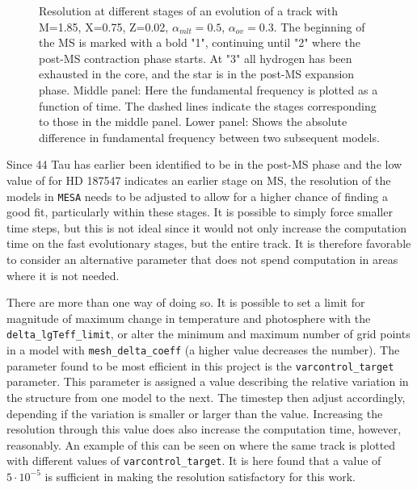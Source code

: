 \begin{figure}[htbp]
    \centering
    \caption{Resolution at different stages of an evolution of a track with M=1.85\msun, X=0.75, Z=0.02, $\alpha_{mlt} = 0.5$, $\alpha_{ov} = 0.3$. The beginning of the MS is marked with a bold "1", continuing until "2" where the post-MS contraction phase starts. At "3" all hydrogen has been exhausted in the core, and the star is in the post-MS expansion phase. Middle panel: Here the fundamental frequency is plotted as a function of time. The dashed lines indicate the stages corresponding to those in the middle panel. Lower panel: Shows the absolute difference in fundamental frequency between two subsequent models.}
    \label{resstage}
\end{figure}

Since 44 Tau has earlier been identified to be in the post-MS phase and the low value of \lum for HD 187547 indicates an earlier stage on MS, the resolution of the models in \texttt{MESA} needs to be adjusted to allow for a higher chance of finding a good fit, particularly within these stages. It is possible to simply force smaller time steps, but this is not ideal since it would not only increase the computation time on the fast evolutionary stages, but the entire track. It is therefore favorable to consider an alternative parameter that does not spend computation in areas where it is not needed. 

There are more than one way of doing so. It is possible to set a limit for magnitude of maximum change in temperature and photosphere with the \texttt{delta\_lgTeff\_limit}, or alter the minimum and maximum number of grid points in a model with \texttt{mesh\_delta\_coeff} (a higher value decreases the number). The parameter found to be most efficient in this project is the \texttt{varcontrol\_target} parameter. This parameter is assigned a value describing the relative variation in the structure from one model to the next. The timestep then adjust accordingly, depending if the variation is smaller or larger than the value. Increasing the resolution through this value does also increase the computation time, however, reasonably. An example of this can be seen on  where the same track is plotted with different values of \texttt{varcontrol\_target}. It is here found that a value of $5\cdot10^{-5}$ is sufficient in making the resolution satisfactory for this work. 

